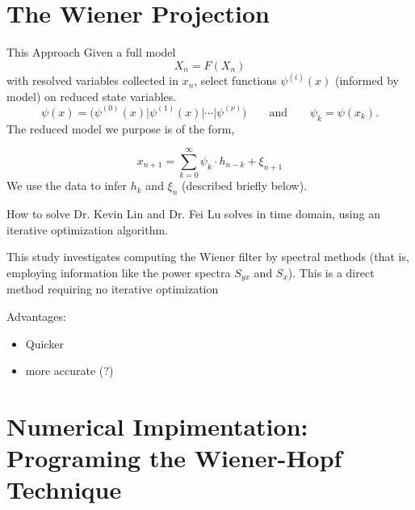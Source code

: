 \documentclass{beamer}  %
\begin{document}
\section{The Wiener Projection}

\begin{frame}{This Approach}
Given a full model
$$X_n = F(X_n)$$
with resolved variables collected in $x_n$,
select functions $\psi^{(i)}(x)$ (informed by model) on reduced state variables.
$$\psi(x) = \Big(\psi^{(0)}(x)\Big|\psi^{(1)}(x)\Big|\cdots\Big|\psi^{(\nu)}\Big)
\qquad\text{and}\qquad\psi_k = \psi(x_k).$$
The reduced model we purpose is of the form,

\begin{equation*}
\boxed{x_{n+1} =  \sum_{k=0}^\infty \psi_{k}\cdot h_{n-k} + \xi_{n+1}}
\end{equation*}
We use the data to infer $h_{k}$ and $\xi_{n}$ (described briefly below).

\end{frame}


\begin{frame}{How to solve}
	Dr. Kevin Lin and Dr. Fei Lu solves in time domain, using an iterative optimization algorithm. 
	
	\bigskip
	
	This study investigates computing the Wiener filter by spectral methods (that is, employing information like the power spectra $S_{yx}$ and $S_{x}$).  This is a direct method requiring no iterative optimization
	
	\bigskip
	
	Advantages:
	\begin{itemize}
		\item Quicker
		\item more accurate (?)
	\end{itemize}
\end{frame}


\section{Numerical Impimentation: Programing the Wiener-Hopf Technique}
\end{document}
